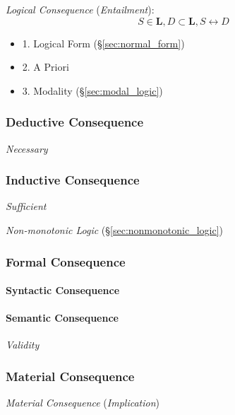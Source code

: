 \emph{Logical Consequence} (\emph{Entailment}):
\[
    S \in \mathbf{L}, D \subset \mathbf{L}, S \leftrightarrow D
\]
\begin{itemize}
    \item 1. Logical Form (\S\ref{sec:normal_form})
    \item 2. A Priori
    \item 3. Modality (\S\ref{sec:modal_logic})
\end{itemize}



\subsubsection{Deductive Consequence}\label{sec:deductive_consequence}

\emph{Necessary}



\subsubsection{Inductive Consequence}\label{sec:inductive_consequence}

\emph{Sufficient}

\emph{Non-monotonic Logic} (\S\ref{sec:nonmonotonic_logic})



\subsubsection{Formal Consequence}\label{sec:formal_consequence}

\paragraph{Syntactic Consequence}\label{sec:syntactic_consequence}

\paragraph{Semantic Consequence}\label{sec:semantic_consequence}

\emph{Validity}



\subsubsection{Material Consequence}

\emph{Material Consequence} (\emph{Implication})



